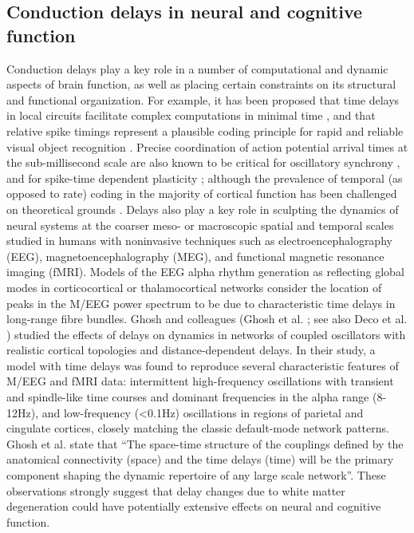 
\subsection{Conduction delays in neural and cognitive function}

Conduction delays play a key role in a number of computational and dynamic aspects of brain function, as well as placing certain constraints on its structural and functional organization. For example, it has been proposed that time delays in local circuits facilitate complex computations in minimal time \cite{izhikevich2006polychronization}, and that relative spike timings represent a plausible coding principle for rapid and reliable visual object recognition \cite{vanrullen2002surfing}. Precise coordination of action potential arrival times at the sub-millisecond scale are also known to be critical for oscillatory synchrony , and for spike-time dependent plasticity 
\cite{markram1997regulation, zhang1998a}; although the prevalence of temporal (as opposed to rate) coding in the majority of cortical function has been challenged on theoretical grounds . Delays also play a key role in sculpting the dynamics of neural systems at the coarser meso- or macroscopic spatial and temporal scales studied in humans with noninvasive techniques such as electroencephalography (EEG), magnetoencephalography (MEG), and functional magnetic resonance imaging (fMRI). Models of the EEG alpha rhythm generation as reflecting global modes in corticocortical \cite{nunez2006electric}  or thalamocortical \cite{robinson2003neurophysical} networks consider the location of peaks in the M/EEG power spectrum to be due to characteristic time delays in long-range fibre bundles. Ghosh and colleagues (Ghosh et al. ; see also Deco et al. \citeyear{deco2009key}) studied the effects of delays on dynamics in networks of coupled oscillators with realistic cortical topologies and distance-dependent delays. In their study, a model with time delays was found to reproduce several characteristic features of M/EEG and fMRI data: intermittent high-frequency oscillations with transient and spindle-like time courses and dominant frequencies in the alpha range (8-12Hz), and low-frequency (<0.1Hz) oscillations in regions of parietal and cingulate cortices, closely matching the classic default-mode network patterns.  Ghosh et al. state that “The space-time structure of the couplings defined by the anatomical connectivity (space) and the time delays (time) will be the primary component shaping
the dynamic repertoire of any large scale network”. These observations strongly suggest that delay changes due to white matter degeneration could have potentially extensive effects on neural and cognitive function. 

